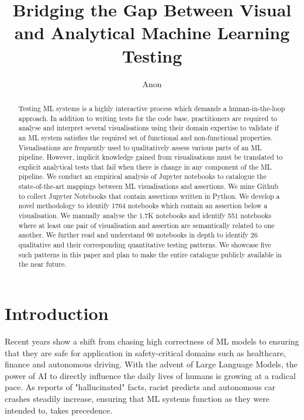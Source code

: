 \documentclass[acmsmall,screen,review,anonymous]{acmart}
\begin{document}
\title{Bridging the Gap Between Visual and Analytical Machine Learning Testing}

\author{Anon}

\begin{abstract}
Testing ML systems is a highly interactive process which demands a human-in-the-loop approach. In addition to writing tests for the code base, practitioners are required to analyse and interpret several visualisations using their domain expertise to validate if an ML system satisfies the required set of functional and non-functional properties. Visualisations are frequently used to qualitatively assess various parts of an ML pipeline. However, implicit knowledge gained from visualisations must be translated to explicit analytical tests that fail when there is change in any component of the ML pipeline. We conduct an empirical analysis of Jupyter notebooks to catalogue the state-of-the-art mappings between ML visualisations and assertions. We mine Github to collect Jupyter Notebooks that contain assertions written in Python. We develop a novel methodology to identify 1764 notebooks which contain an assertion below a visualisation. We manually analyse the 1.7K notebooks and identify 551 notebooks where at least one pair of visualisation and assertion are semantically related to one another. We further read and understand 90 notebooks in depth to identify 26 qualitative and their corresponding quantitative testing patterns. We showcase five such patterns in this paper and plan to make the entire catalogue publicly available in the near future.

\end{abstract}

\maketitle

\section{Introduction}\label{sec:intro}

Recent years show a shift from chasing high correctness of ML models to ensuring that they are safe for application in safety-critical domains such as healthcare, finance and autonomous driving. With the advent of Large Language Models, the power of AI to directly influence the daily lives of humans is growing at a radical pace. As reports of "hallucinated" facts, racist predicts and autonomous car crashes steadily increase, ensuring that ML systems function as they were intended to, takes precedence.
\end{document}
